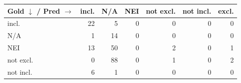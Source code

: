 \begin{tabular}{lrrrrrr}
\toprule
Gold $\downarrow$ / Pred $\rightarrow$ & incl. & N/A & NEI & not excl. & not incl. & excl. \\
\midrule
incl. & 22 & 5 & 0 & 0 & 0 & 0 \\
N/A & 1 & 14 & 0 & 0 & 0 & 0 \\
NEI & 13 & 50 & 0 & 2 & 0 & 1 \\
not excl. & 0 & 88 & 0 & 1 & 0 & 2 \\
not incl. & 6 & 1 & 0 & 0 & 0 & 0 \\
\bottomrule
\end{tabular}
